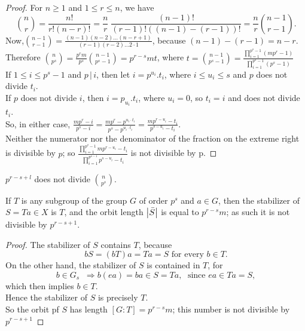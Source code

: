 \documentclass[../main-sheet.tex]{subfiles}
\begin{document}
\begin{proof}
    For \(n \geq 1\) and \(1 \leq r \leq n\), we have
    \[
        \binom{n}{r}=\frac{n!}{r!(n-r)!}=\frac{n}{r}\;\frac{(n-1)!}{(r-1)!((n-1)-(r-1))!}=\frac{n}{r}\binom{n-1}{r-1}.
    \]
    Now,\(\binom{n-1}{r-1}=\frac{(n-1)(n-2)\dots(n-r+1)}{(r-1)(r-2)\dots2\cdot1}\), because \((n - 1) - (r - 1) = n - r\).\\
    Therefore \(\binom{n}{p^s}=\frac{p^rm}{p^s}\binom{n-1}{p^s-1}=p^{r-s}mt\), where \(t = \binom{n-1}{p^s-1}=\frac{\prod_{i=1}^{p^s-1}(mp^r-1)}{\prod_{i=1}^{p^s-1}(p^s-1)}\)\\
    If \(1 \leq i \leq p^s - 1\) and \(p \,|\, i\), then let \(i = p^{u_i}.t_i \), where \(i \leq u_i \leq s\) and \(p\) does not divide \(t_i\).\\
    If \(p\) does not divide \(i\), then \(i =p_{u_i}. t_i\), where \(u_i = 0\), so \(t_i = i\) and does not divide \(t_i\).\\
    So, in either case, \(\frac{mp^r-i}{p^s-i}=\frac{mp^{r}-p^{u_i\cdot t_i}}{p^s-p^{u_i\cdot t_i}}=\frac{mp^{r-u_i}-t_i}{p^{s-u_i}- t_i}\).\\
    Neither the numerator nor the denominator of the fraction on the extreme right is
    divisible by \(p\); so \(\frac{\prod_{i=1}^{p^s-1}mp^{r-u_i}-t_i}{\prod_{i=1}^{p^{s-1}}p^{s-u_i}- t_i}\) is not divisible by p.
    \end{proof}
    \begin{cor}
        \(p^{r-s+ l}\) does not divide \(\binom{n}{p^s}\).
    \end{cor}
\begin{cor}\label{cor:10.2}
    If \(T\) is any subgroup of the group \(G\) of order \(p^s\) and \(a \in G\), then the stabilizer of \(S = Ta \in X\) is \(T\), and the orbit length \(\left\vert\bar{S}\right\vert\) is equal to \(p^{r-s}m\); as such it is not divisible by \(p^{r-s+1}\).
\end{cor}
\begin{proof}
    The stabilizer of \(S\) contains \(T \), because
    \[ bS = (bT)a = Ta = S \text{ for every  } b \in T.\]
    On the other hand, the stabilizer of \(S\) is contained in \(T \), for
    \[b \in G_s \;\;\Rightarrow b( ea ) = ba \in S = Ta,\; \text{ since } ea \in Ta = S ,\]
    which then implies \(b \in T\).\\
    Hence the stabilizer of \(S\) is precisely \(T\).\\
    So the orbit pf \(S\) has length \([G: T ] = p^{ r-s}m\); this number is not divisible by \(p^{r-s + 1}\)
\end{proof}
\end{document}
